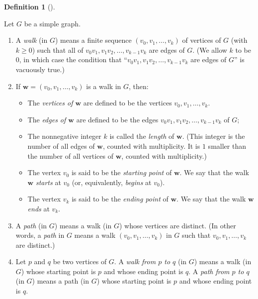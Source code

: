 \documentclass[numbers=enddot,12pt,final,onecolumn,notitlepage]{scrartcl}%
\theoremstyle{definition}
\newtheorem{defi}[theo]{Definition}
\newenvironment{definition}[1][]
{\begin{defi}[#1]\begin{leftbar}}
{\end{leftbar}\end{defi}}
\newcommand{\tup}[1]{\left( #1 \right)}
\begin{document}
\begin{definition} \label{def.intro.walks}
Let $G$ be a simple graph.

\begin{enumerate}

\item[\textbf{(a)}] A \textit{walk} (in $G$) means a finite
sequence $\tup{v_0, v_1, \ldots, v_k}$ of vertices of $G$
(with $k \geq 0$) such that all of
$v_0 v_1, v_1 v_2, \ldots, v_{k-1} v_k$ are edges of $G$. (We allow
$k$ to be $0$, in which case the condition that
``$v_0 v_1, v_1 v_2, \ldots, v_{k-1} v_k$ are edges of $G$'' is
vacuously true.)

\item[\textbf{(b)}] If $\mathbf{w} = \tup{v_0, v_1, \ldots, v_k}$
is a walk in $G$, then:

\begin{itemize}
\item The \textit{vertices of $\mathbf{w}$} are defined to be
the vertices $v_0, v_1, \ldots, v_k$.
\item The
\textit{edges of $\mathbf{w}$} are defined to be the edges
$v_0 v_1, v_1 v_2, \ldots, v_{k-1} v_k$ of $G$;
\item The nonnegative integer $k$ is called the
\textit{length} of $\mathbf{w}$. (This integer is the number of all
edges of $\mathbf{w}$, counted with multiplicity. It is $1$ smaller
than the number of all vertices of $\mathbf{w}$, counted with
multiplicity.)
\item The vertex $v_0$ is said to be the \textit{starting point} of
$\mathbf{w}$. We say that the walk $\mathbf{w}$ \textit{starts} at
$v_0$ (or, equivalently, \textit{begins} at $v_0$).
\item The vertex $v_k$ is said to be the \textit{ending point} of
$\mathbf{w}$. We say that the walk $\mathbf{w}$ \textit{ends} at
$v_k$.
\end{itemize}

\item[\textbf{(c)}] A \textit{path} (in $G$) means a walk (in $G$)
whose vertices are distinct. (In other words, a \textit{path} in
$G$ means a walk $\tup{v_0, v_1, \ldots, v_k}$ in $G$ such that
$v_0, v_1, \ldots, v_k$ are distinct.)

\item[\textbf{(e)}] Let $p$ and $q$ be two vertices of $G$. A
\textit{walk from $p$ to $q$} (in $G$) means a walk (in $G$) whose
starting point is $p$ and whose ending point is $q$. A
\textit{path from $p$ to $q$} (in $G$) means a path (in $G$) whose
starting point is $p$ and whose ending point is $q$.

\end{enumerate}

\end{definition}
\end{document}
